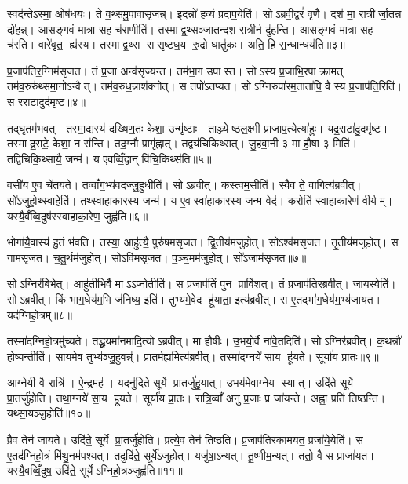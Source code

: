 स्वद॑न्तेऽस्मा॒ ओष॑धयः। ते व॒थ्समु॒पावा॑सृजन्न्। इ॒दन्नो॑ ह॒व्यं प्रदा॑प॒येति॑। सोऽब्रवी॒द्वरं॑ वृणै। दश॑ मा॒ रात्रीर्जा॒तन्न दो॑हन्न्। आ॒स॒ङ्ग॒वं मा॒त्रा स॒ह च॑रा॒णीति॑। तस्माद्व॒थ्सञ्जा॒तन्दश॒ रात्री॒र्न दु॑हन्ति। आ॒स॒ङ्ग॒वं मा॒त्रा स॒ह च॑रति। वारे॑वृत॒ ह्य॑स्य। तस्माद्व॒थ्स ससृष्टध॒य रु॒द्रो घातु॑कः। अति॒ हि स॒न्धान्धय॑ति॥३॥\anuvakamend[अ॒लि॒म्प॒न्वेद॒ घातु॑क॒ एक॑ञ्च]

प्र॒जाप॑तिर॒ग्निम॑सृजत। तं प्र॒जा अन्व॑सृज्यन्त। तम॑भा॒ग उपास्त। सोऽस्य प्र॒जाभि॒रपाक्रामत्। तम॑व॒रुरु॑थ्समा॒नोऽन्वैत्। तम॑व॒रुध॒न्नाश॑क्नोत्। स तपो॑ऽतप्यत। सोऽग्निरुपा॑रम॒ताता॑पि॒ वै स्य प्र॒जाप॑ति॒रिति॑। स र॒राटा॒दुद॑मृष्ट॥४॥

तद्घृ॒तम॑भवत्। तस्मा॒द्यस्य॑ दख्षिण॒तः केशा॒ उन्मृ॑ष्टाः। ताञ्ज्येष्ठल॒क्ष्मी प्रा॑जाप॒त्येत्या॑हुः। यद्र॒राटा॑दु॒दमृ॑ष्ट। तस्माद्र॒राटे॒ केशा॒ न स॑न्ति। तद॒ग्नौ प्रागृ॑ह्णात्। तद्व्य॑चिकिथ्सत्। जु॒हवा॒नी ३ मा हौ॒षा ३ मिति॑। तद्वि॑चिकि॒थ्सायै॒ जन्म॑। य ए॒वव्विँ॒द्वान् वि॑चि॒किथ्स॑ति॥५॥

वसी॑य ए॒व चे॑तयते। तव्वाँग॒भ्य॑वदज्जु॒हुधीति॑। सोऽब्रवीत्। कस्त्वम॒सीति॑। स्वैव ते॒ वागित्य॑ब्रवीत्। सो॑ऽजुहो॒थ्स्वाहेति॑। तथ्स्वा॑हाका॒रस्य॒ जन्म॑। य ए॒वस्वा॑हाका॒रस्य॒ जन्म॒ वेद॑। क॒रोति॑ स्वाहाका॒रेण॑ वी॒र्यम्। यस्यै॒वँव्वि॒दुष॑स्स्वाहाका॒रेण॒ जुह्व॑ति॥६॥

भोगा॑यै॒वास्य॑ हु॒तं भ॑वति। तस्या॒ आहु॑त्यै॒ पुरु॑षमसृजत। द्वि॒तीय॑मजुहोत्। सोऽश्व॑मसृजत। तृ॒तीय॑मजुहोत्। स गाम॑सृजत। च॒तु॒र्थम॑जुहोत्। सोऽवि॑मसृजत। प॒ञ्च॒मम॑जुहोत्। सो॑ऽजाम॑सृजत॥७॥

सोऽग्निर॑बिभेत्। आहु॑तीभि॒र्वै माऽऽप्नो॒तीति॑। स प्र॒जाप॑तिं॒ पुन॒ प्रावि॑शत्। तं प्र॒जाप॑तिरब्रवीत्। जाय॒स्वेति॑। सोऽब्रवीत्। किं भा॑ग॒धेय॑म॒भि ज॑निष्य॒ इति॑। तुभ्य॑मे॒वेद हू॑याता॒ इत्य॑ब्रवीत्। स ए॒तद्भा॑ग॒धेय॑म॒भ्य॑जायत। यद॑ग्निहो॒त्रम्॥८॥

तस्मा॑दग्निहो॒त्रमु॑च्यते। तद्धू॒यमा॑नमादि॒त्योऽब्रवीत्। मा हौ॑षीः। उ॒भयो॒र्वै ना॑वे॒तदिति॑। सोऽग्निर॑ब्रवीत्। क॒थन्नौ॑ होष्य॒न्तीति॑। सा॒यमे॒व तुभ्य॑ञ्जु॒हुवन्न्॑। प्रा॒तर्मह्य॒मित्य॑ब्रवीत्। तस्मा॑द॒ग्नये॑ सा॒य हू॑यते। सूर्या॑य प्रा॒तः॥९॥

आ॒ग्ने॒यी वै रात्रि॑। ऐ॒न्द्रमह॑। यदनु॑दिते॒ सूर्ये प्रा॒तर्जु॑हु॒यात्। उ॒भय॑मे॒वाग्ने॒य स्यात्। उदि॑ते॒ सूर्ये प्रा॒तर्जु॑होति। तथा॒ग्नये॑ सा॒य हू॑यते। सूर्या॑य प्रा॒तः। रात्रि॒व्वाँ अनु॑ प्र॒जाः प्र जा॑यन्ते। अह्ना॒ प्रति॑ तिष्ठन्ति। यथ्सा॒यञ्जु॒होति॑॥१०॥

प्रैव तेन॑ जायते। उदि॑ते॒ सूर्ये प्रा॒तर्जु॑होति। प्रत्ये॒व तेन॑ तिष्ठति। प्र॒जाप॑तिरकामयत॒ प्रजा॑ये॒येति॑। स ए॒तद॑ग्निहो॒त्रं मि॑थु॒नम॑पश्यत्। तदुदि॑ते॒ सूर्ये॑ऽजुहोत्। यजु॑षा॒ऽन्यत्। तू॒ष्णीम॒न्यत्। ततो॒ वै स प्राजा॑यत। यस्यै॒वव्विँ॒दुष॒ उदि॑ते॒ सूर्येऽग्निहो॒त्रञ्जुह्व॑ति॥११॥

